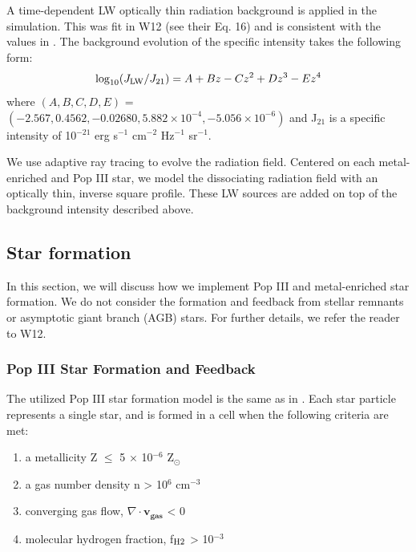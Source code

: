 \documentclass[a4paper,fleqn,usenatbib]{mnras}
\begin{document}
A time-dependent LW optically thin radiation background is applied in the simulation. This was fit in W12 (see their Eq. 16) and is consistent with the values in \citet{Trenti09_SFR}. The background evolution of the specific intensity takes the following form:
\begin{equation} \label{LWbg}
	\log_{10}(J_{\rm LW}/J_{21}) = A + Bz - Cz^{2} + Dz^{3} - Ez^{4}
\end{equation}
where $(A, B, C, D, E)$ = $(-2.567, 0.4562, - 0.02680, 5.882 \times 10^{-4}, - 5.056 \times 10^{-6})$ and J$_{21}$ is a specific intensity of 10$^{-21}$ erg s$^{-1}$ cm$^{-2}$ Hz$^{-1}$ sr$^{-1}$. 

We use adaptive ray tracing \citep{Abel02_RT, Wise11_Moray} to evolve the radiation field. Centered on each metal-enriched and Pop III star, we model the \hh{} dissociating radiation field with an optically thin, inverse square profile. These LW sources are added on top of the background intensity described above.
\subsection{Star formation}
In this section, we will discuss how we implement Pop III and metal-enriched star formation. We do not consider the formation and feedback from stellar remnants or asymptotic giant branch (AGB) stars. For further details, we refer the reader to W12. 

\subsubsection{Pop III Star Formation and Feedback }
The utilized Pop III star formation model is the same as in \citet{Wise08_Gal}. Each star particle represents a single star, and is formed in a cell when the following criteria are met: 
\begin{enumerate}
	\item a metallicity Z $\leq$ 5 $\times$ 10$^{-6}$ Z$_{\odot}$

	\item a gas number density n > 10$^{6}$ cm$^{-3}$

	\item converging gas flow, $\nabla \cdot \mathbf{v_{gas}}$ < 0 

	\item molecular hydrogen fraction, f$_{\rm H2}$ > 10$^{-3}$
\end{enumerate}
\end{document}
